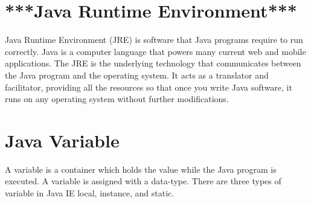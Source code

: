 \documentclass[twocolumn, a4paper]{article}
\begin{document}
\section{***Java Runtime Environment***}
Java Runtime Environment (JRE) is software that Java programs require to run
correctly. Java is a computer language that powers many current web and mobile
applications. The JRE is the underlying technology that communicates between
the Java program and the operating system. It acts as a translator and
facilitator, providing all the resources so that once you write Java software,
it runs on any operating system without further modifications.

\begin{table}[h]%
  \centering
  \caption{Different Java data-types}
  \label{tab:javadatatypes}
\end{table}

\section{Java Variable}
A variable is a container which holds the value while the Java program is
executed. A variable is assigned with a data-type. There are three types of
variable in Java IE local, instance, and static.
\end{document}
